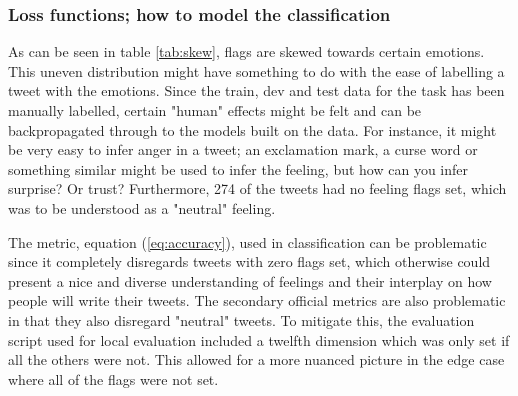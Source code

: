 \subsubsection{Loss functions; how to model the classification} \label{sec:lossdiscussion}
As can be seen in table \ref{tab:skew}, flags are skewed towards certain emotions. This uneven distribution might have something to do with the ease of labelling a tweet with the emotions. Since the train, dev and test data for the task has been manually labelled, certain "human" effects might be felt and can be backpropagated through to the models built on the data. For instance, it might be very easy to infer anger in a tweet; an exclamation mark, a curse word or something similar might be used to infer the feeling, but how can you infer surprise? Or trust? Furthermore, 274 of the tweets had no feeling flags set, which was to be understood as a "neutral" feeling.\\
\begin{table}[H]
\caption{The actual flags set and percentage of the full classification dataset}
\label{tab:skew}
\end{table}
The metric, equation (\ref{eq:accuracy}), used in classification can be problematic since it completely disregards tweets with zero flags set, which otherwise could present a nice and diverse understanding of feelings and their interplay on how people will write their tweets. The secondary official metrics are also problematic in that they also disregard "neutral" tweets. To mitigate this, the evaluation script used for local evaluation included a twelfth dimension which was only set if all the others were not. This allowed for a more nuanced picture in the edge case where all of the flags were not set.

